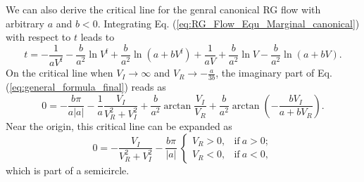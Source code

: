 \documentclass[aps,onecolumn,nofootinbib,superscriptaddress,notitlepage,longbibliography]{revtex4-1}
\begin{document}
We can also derive the critical line for the genral canonical RG flow with arbitrary $a$ and $b<0$. Integrating Eq. (\ref{eq:RG_Flow_Equ_Marginal_canonical}) with respect to $t$ leads to 
\begin{equation}
	t=-\frac{1}{a V^{\mathrm{f}}}-\frac{b}{a^2}\ln{V^\mathrm{f}}+\frac{b}{a^2}\ln{(a+b V^\mathrm{f})}+\frac{1}{a V}+\frac{b}{a^2}\ln{V}-\frac{b}{a^2}\ln{(a+b V)}.
\label{eq:general_formula_final}
\end{equation}
On the critical line when $V_I\to\infty$ and $V_R\to-\frac{a}{3b}$, the imaginary part of Eq. (\ref{eq:general_formula_final}) reads as 
\begin{equation}
	0=-\frac{b\pi}{a|a|}-\frac{1}{a}\frac{V_I}{V_R^2+V_I^2}+\frac{b}{a^2}\arctan{\frac{V_I}{V_R}}+\frac{b}{a^2}\arctan{(-\frac{b V_I}{a+b V_R})}.
\label{eq:imaginary_part_boundary}
\end{equation}
Near the origin, this critical line can be expanded as 
\begin{equation}
0=-\frac{V_I}{V_R^2+V_I^2}-\frac{b\pi}{|a|}\:
\begin{cases}
	V_R>0, &\mathrm{if}\:a>0;\\
	V_R<0, &\mathrm{if}\:a<0,
\end{cases}
\end{equation}
which is part of a semicircle.


\end{document}
